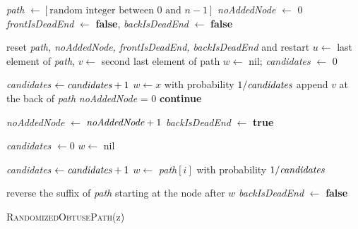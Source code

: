 \documentclass[a4paper, 10pt, ngerman]{article}
\begin{document}
\begin{algorithm}
    \emph{path} $\gets [\text{random integer between 0 and $n - 1$}]$ \; 
    \emph{noAddedNode} $\gets$ 0 \;
    \emph{frontIsDeadEnd} $\gets$ \textbf{false}, \emph{backIsDeadEnd}  $\gets$ \textbf{false}\;

    {
        {
            reset \emph{path, noAddedNode, frontIsDeadEnd, backIsDeadEnd} and restart \;
        }
        $u \gets$ last element of \emph{path}, $v \gets$ second last element of path \;
        $w \gets$ nil; \;
        \emph{candidates} $\gets$ 0 \;

        {
            {
                \emph{candidates} $\gets \emph{candidates} + 1$ \;
                $w \gets x$ with probability $1 / \emph{candidates}$ \;
            }
        }
        {
            append $v$ at the back of \emph{path} \;
            \emph{noAddedNode} = 0 \;
            \textbf{continue} \;
        }

        \emph{noAddedNode} $\gets$ $\emph{noAddedNode} + 1$ \;
        \emph{backIsDeadEnd} $\gets$ \textbf{true} \;

        {
            \emph{candidates} $\gets 0$ \;
            $w \gets$ nil \;

            {
                {
                    \emph{candidates} $\gets \emph{candidates} + 1$ \;
                    $w \gets$ \emph{path}$[i]$ with probability $1 / \emph{candidates}$ \;
                }
            }

            {
                reverse the suffix of \emph{path} starting at the node after $w$ \;
                \emph{backIsDeadEnd} $\gets$ \textbf{false} \;
            } 
        } 

    }


    \caption{\textsc{RandomizedObtusePath}(z)}
\end{algorithm}
\end{document}

